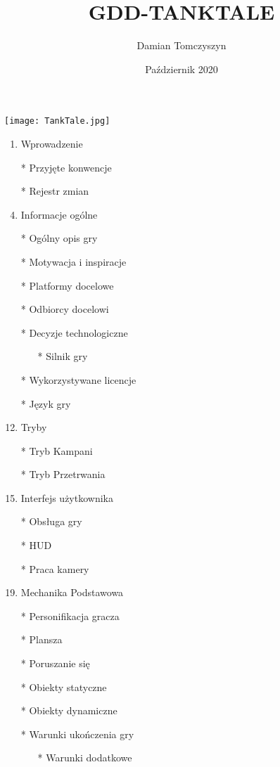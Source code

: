 \documentclass{article}
\title{GDD-TANKTALE}
\author{Damian Tomczyszyn}
\date{Październik 2020}
\begin{document}
\maketitle

\centering
\texttt{[image: TankTale.jpg]}

\newpage
{}
\begin{enumerate}
	\item Wprowadzenie
	    \item[*] Przyjęte konwencje
	    \item[*] Rejestr zmian
	\item Informacje ogólne
	    \item[*] Ogólny opis gry
	    \item[*] Motywacja i inspiracje
	    \item[*] Platformy docelowe
	    \item[*] Odbiorcy docelowi
	    \item[*] Decyzje technologiczne
	       \begin{enumerate}
	    \item[*] Silnik gry
	    \end{enumerate}
	    \item[*] Wykorzystywane licencje
	    \item[*] Język gry
	\item Tryby
	    \item[*] Tryb Kampani
	    \item[*] Tryb Przetrwania
    \item Interfejs użytkownika
        \item[*] Obsługa gry
	    \item[*] HUD
	    \item[*] Praca kamery
	    
	\item Mechanika Podstawowa
	    \item[*] Personifikacja gracza
	    \item[*] Plansza
	    \item[*] Poruszanie się
	    \item[*] Obiekty statyczne 
	    
	    \item[*] Obiekty dynamiczne 
	    
	    \item[*] Warunki ukończenia gry 
	    \begin{enumerate}
	    \item[*] Warunki dodatkowe
	    \end{enumerate}
	    

\end{enumerate}
\end{document}
